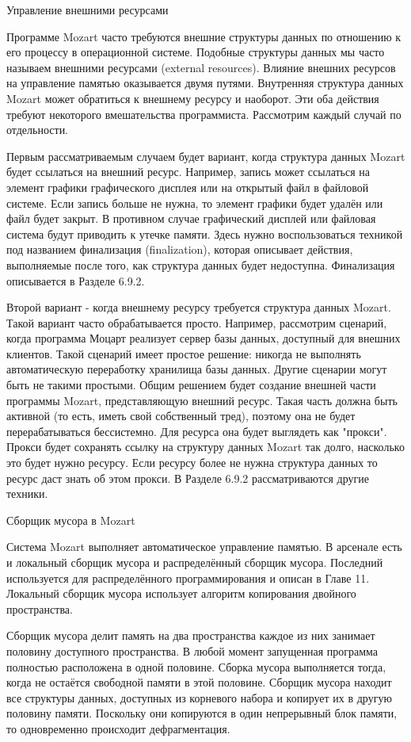 Управление внешними ресурсами

Программе Mozart часто требуются внешние структуры данных по отношению к его процессу в операционной системе. Подобные структуры данных мы часто называем внешними ресурсами (external resources). Влияние внешних ресурсов на управление памятью оказывается двумя путями. Внутренняя структура данных Mozart может обратиться к внешнему ресурсу и наоборот. Эти оба действия требуют некоторого вмешательства программиста. Рассмотрим каждый случай по отдельности.

Первым рассматриваемым случаем будет вариант, когда структура данных Mozart будет ссылаться на внешний ресурс. Например, запись может ссылаться на элемент графики графического дисплея или на открытый файл в файловой системе. Если запись больше не нужна, то элемент графики будет удалён или файл будет закрыт. В противном случае графический дисплей или файловая система будут приводить к утечке памяти. Здесь нужно воспользоваться техникой под названием финализация (finalization), которая описывает действия, выполняемые после того, как структура данных будет недоступна. Финализация описывается в Разделе 6.9.2.

Второй вариант - когда внешнему ресурсу требуется структура данных Mozart. Такой вариант часто обрабатывается просто. Например, рассмотрим сценарий, когда программа Моцарт реализует сервер базы данных, доступный для внешних клиентов. Такой сценарий имеет простое решение: никогда не выполнять автоматическую переработку хранилища базы данных. Другие сценарии могут быть не такими простыми. Общим решением будет создание внешней части программы Mozart, представляющую внешний ресурс. Такая часть должна быть активной (то есть, иметь свой собственный тред), поэтому она не будет перерабатываться бессистемно. Для ресурса она будет выглядеть как "прокси". Прокси будет сохранять ссылку на структуру данных Mozart так долго, насколько это будет нужно ресурсу. Если ресурсу более не нужна структура данных то ресурс даст знать об этом прокси. В Разделе 6.9.2 рассматриваются другие техники.

Сборщик мусора в Mozart

Система Mozart выполняет автоматическое управление памятью. В арсенале есть и локальный сборщик мусора и распределённый сборщик мусора. Последний используется для распределённого программирования и описан в Главе 11. Локальный сборщик мусора использует алгоритм копирования двойного пространства.

Сборщик мусора делит память на два пространства каждое из них занимает половину доступного пространства. В любой момент запущенная программа полностью расположена в одной половине. Сборка мусора выполняется тогда, когда не остаётся свободной памяти в этой половине. Сборщик мусора находит все структуры данных, доступных из корневого набора и копирует их в другую половину памяти. Поскольку они копируются в один непрерывный блок памяти, то одновременно происходит дефрагментация.

